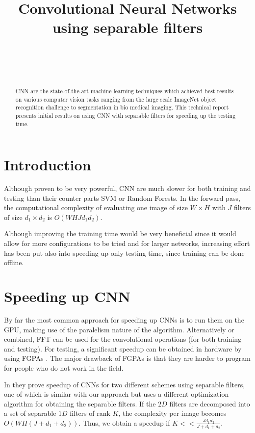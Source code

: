 \documentclass{article} %
\title{Convolutional Neural Networks using separable filters}
\author{
\fontsize{8}{8}\selectfont{Petrescu Viviana}\\
\fontsize{8}{8}\selectfont{EPFL} \\
\fontsize{8}{8}\selectfont{\texttt{viviana.petrescu@epfl.ch}} \\
}
\begin{document}
\maketitle

\begin{abstract}
CNN are the state-of-the-art machine learning techniques which achieved best results on various computer vision tasks ranging from the large scale ImageNet object recognition challenge to segmentation in bio medical imaging.
This technical report presents initial results on using CNN with separable filters for speeding up the testing time.
\end{abstract}

\section{Introduction}
Although proven to be very powerful, CNN are much slower for both training and testing than their counter parts SVM or Random Forests.
In the forward pass, the computational complexity of evaluating one image of size $W\times H$ with $J$ filters of size $d_{1}\times d_{2}$ is $O(WHJd_{1}d_{2})$.
 
 Although improving the training time would be very beneficial since it would allow for more configurations to be tried and for larger networks, increasing effort has been put also into speeding up only testing time, since training can be done offline.

\section{Speeding up CNN}
By far the most common approach for speeding up CNNs is to run them on the GPU, making use of the paralelism nature of the algorithm. Alternatively or combined, FFT can be used for the convolutional operations (for  both training and testing)\cite{DBLP:journals/corr/MathieuHL13}.  For testing, a significant speedup can be obtained in hardware by using FGPAs \citep{lecun2010convolutional}. The major drawback of FGPAs is that they are harder to program for people who do not work in the field.

 In \citep{Jaderberg14b} they prove speedup of CNNs for two different schemes using separable filters, one of which is similar with our approach but uses a different optimization algorithm for obtaining the separable filters. 
  If the $2D$ filters are decomposed into a set of separable $1D$ filters of rank $K$, the complexity per image becomes
 $O(WH(J +d_{1}+d_{2}))$. Thus, we obtain a speedup if $K<< \frac{Jd_{1}d_{2}}{J +d_{1}+d_{2}}$. 
\end{document}
